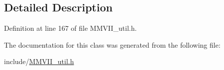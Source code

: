 \subsection{Detailed Description}


Definition at line 167 of file M\+M\+V\+I\+I\+\_\+util.\+h.



The documentation for this class was generated from the following file\+:\begin{DoxyCompactItemize}
\item 
include/\hyperlink{MMVII__util_8h}{M\+M\+V\+I\+I\+\_\+util.\+h}\end{DoxyCompactItemize}
